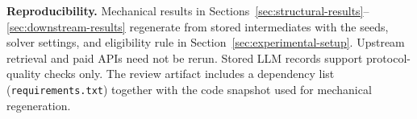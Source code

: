 \documentclass[manuscript,anonymous,review]{acmart}
\begin{document}
\textbf{Reproducibility.} Mechanical results in
Sections~\ref{sec:structural-results}--\ref{sec:downstream-results} regenerate
from stored intermediates with the seeds, solver settings, and eligibility rule
in Section~\ref{sec:experimental-setup}. Upstream retrieval and paid APIs need
not be rerun. Stored LLM records support protocol-quality checks only. The review
artifact includes a dependency list (\texttt{requirements.txt}) together with
the code snapshot used for mechanical regeneration.

\begin{acks}
\end{acks}



\end{document}
